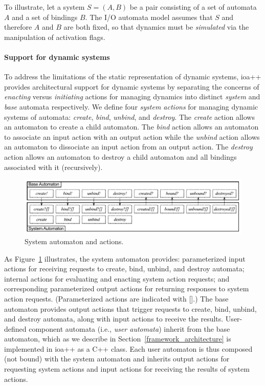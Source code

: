 To illustrate, let a system $S=(A,B)$ be a pair consisting of a set of automata $A$ and a set of bindings $B$.
The I/O automata model assumes that $S$ and therefore $A$ and $B$ are both fixed, so that dynamics must be \emph{simulated} via the manipulation of activation flags.

\paragraph*{Support for dynamic systems}
To address the limitations of the static representation of dynamic systems, ioa++ provides
architectural support for dynamic systems by separating the concerns of \emph{enacting} versus \emph{initiating} 
actions for managing dynamics into distinct \emph{system} and \emph{base} automata respectively.
We define four \emph{system actions} for managing dynamic systems of automata: \emph{create}, \emph{bind}, \emph{unbind}, and \emph{destroy}.
The \emph{create} action allows an automaton to create a child automaton.
The \emph{bind} action allows an automaton to associate an input action with an output action while the \emph{unbind} action allows an automaton to dissociate an input action from an output action.
The \emph{destroy} action allows an automaton to destroy a child automaton and all bindings associated with it (recursively).

\begin{figure}
\center
\includegraphics[width=\textwidth]{system_action}
\caption{System automaton and actions.}
\label{system_action}
\end{figure}
As Figure~\ref{system_action} illustrates, the system automaton provides: parameterized input actions for receiving requests to create, bind, unbind, and destroy automata; internal actions for evaluating and enacting system action requests; and corresponding parameterized output actions for returning responses to system action requests.
(Parameterized actions are indicated with [].)
The base automaton provides output actions that trigger requests to create, bind, unbind, and destroy automata, along with
input actions to receive the results.
User-defined component automata (i.e., \emph{user automata}) inherit from the base automaton, which as we describe in Section~\ref{framework_architecture} is implemented in ioa++ as a C++ class. 
Each user automaton is thus composed (not bound) with the system automaton and inherits output actions for requesting system actions and input actions for receiving the results of system actions.

